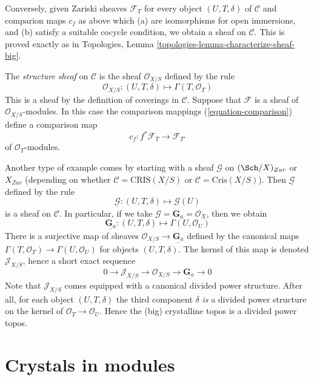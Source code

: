 \medskip\noindent
Conversely, given Zariski sheaves $\mathcal{F}_T$ for every object
$(U, T, \delta)$ of $\mathcal{C}$ and comparion maps
$c_f$ as above which (a) are isomorphisms for open immersions, and (b)
satisfy a suitable cocycle condition, we obtain a sheaf on
$\mathcal{C}$. This is proved exactly as in
Topologies, Lemma \ref{topologies-lemma-characterize-sheaf-big}.

\medskip\noindent
The {\it structure sheaf} on $\mathcal{C}$ is the sheaf
$\mathcal{O}_{X/S}$ defined by the rule
$$
\mathcal{O}_{X/S} :
(U, T, \delta)
\longmapsto
\Gamma(T, \mathcal{O}_T)
$$
This is a sheaf by the definition of coverings in $\mathcal{C}$.
Suppose that $\mathcal{F}$ is a sheaf of $\mathcal{O}_{X/S}$-modules.
In this case the comparison mappings (\ref{equation-comparison})
define a comparison map
\begin{equation}
\label{equation-comparison-modules}
c_f : f^*\mathcal{F}_T \longrightarrow \mathcal{F}_{T'}
\end{equation}
of $\mathcal{O}_T$-modules.

\medskip\noindent
Another type of example comes by starting with a sheaf
$\mathcal{G}$ on $(\Sch/X)_{Zar}$ or $X_{Zar}$ (depending on whether
$\mathcal{C} = \text{CRIS}(X/S)$ or $\mathcal{C} = \text{Cris}(X/S)$).
Then $\underline{\mathcal{G}}$ defined by the rule
$$
\underline{\mathcal{G}} :
(U, T, \delta)
\longmapsto
\mathcal{G}(U)
$$
is a sheaf on $\mathcal{C}$. In particular, if we take
$\mathcal{G} = \mathbf{G}_a = \mathcal{O}_X$, then we obtain
$$
\underline{\mathbf{G}_a} :
(U, T, \delta)
\longmapsto
\Gamma(U, \mathcal{O}_U)
$$
There is a surjective map of sheaves
$\mathcal{O}_{X/S} \to \underline{\mathbf{G}_a}$ defined by the
canonical maps $\Gamma(T, \mathcal{O}_T) \to \Gamma(U, \mathcal{O}_U)$
for objects $(U, T, \delta)$. The kernel of this map is denoted
$\mathcal{J}_{X/S}$, hence a short exact sequence
$$
0 \to
\mathcal{J}_{X/S} \to
\mathcal{O}_{X/S} \to
\underline{\mathbf{G}_a} \to 0
$$
Note that $\mathcal{J}_{X/S}$ comes equipped with a canonical
divided power structure. After all, for each object $(U, T, \delta)$
the third component $\delta$ {\it is} a divided power structure on the
kernel of $\mathcal{O}_T \to \mathcal{O}_U$. Hence the (big)
crystalline topos is a divided power topos.





\section{Crystals in modules}
\label{section-crystals}

